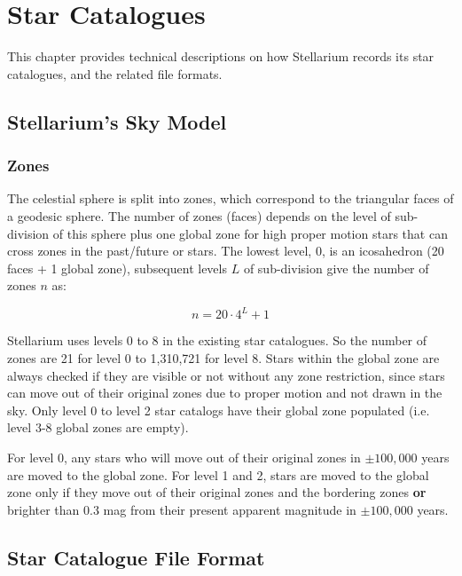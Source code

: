 
\chapter{Star Catalogues}
\label{ch:Catalogues}

This chapter provides technical descriptions on how Stellarium records its star catalogues, and
the related file formats.

\section{Stellarium's Sky Model}
\label{sec:Catalogues:SkyModel}

\subsection{Zones}
\label{sec:Catalogues:SkyModel:Zones}

The celestial sphere is split into zones, which correspond to the
triangular faces of a geodesic sphere. The number of zones (faces)
depends on the level of sub-division of this sphere plus one global zone for 
high proper motion stars that can cross zones in the past/future or stars. The lowest level,
0, is an icosahedron (20 faces + 1 global zone), subsequent levels $L$ of sub-division
give the number of zones $n$ as:

\begin{equation}
n=20 \cdot 4^L + 1
\end{equation}

Stellarium uses levels 0 to 8 in the existing star catalogues. So the number of zones are 21 for level 0 to 1,310,721 for level 8.
Stars within the global zone are always checked if they are visible or not without any zone restriction, since stars can move 
out of their original zones due to proper motion and not drawn in the sky. Only level 0 to level 2 star catalogs have their global 
zone populated (i.e. level 3-8 global zones are empty).

For level 0, any stars who will move out of their original zones in $\pm 100,000$ years are moved to the global zone. For level 1 and 2, stars are moved 
to the global zone only if they move out of their original zones and the bordering zones \textbf{or} brighter than 0.3 mag from their 
present apparent magnitude in $\pm 100,000$ years.

\section{Star Catalogue File Format}%
\label{sec:Catalogues:stars}

